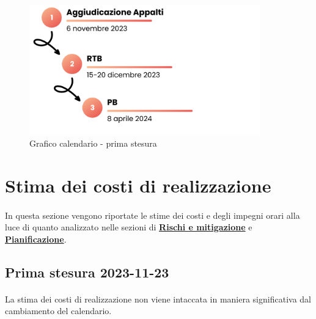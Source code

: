 \documentclass[10pt, a4paper]{article}
\begin{document}
{{{{{{ \begin{figure}[H]
        \centering
        \includegraphics[width=10cm]{Calendario di massima - prima stesura.png}
        \caption{Grafico calendario - prima stesura}
    \end{figure}

\section{Stima dei costi di realizzazione}
\paragraph{}In questa sezione vengono riportate le stime dei costi e degli impegni orari alla luce di quanto analizzato nelle sezioni di \hyperref[section:Rischi]{\textbf{Rischi e mitigazione}} e \hyperref[section:Pianificazione]{\textbf{Pianificazione}}.

\subsection{Prima stesura 2023-11-23}
\paragraph{}La stima dei costi di realizzazione non viene intaccata in maniera significativa dal cambiamento del calendario.

}}}}}}
\end{document}
